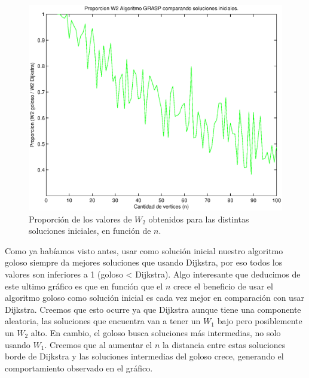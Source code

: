 \begin{figure}[H]
  \begin{center}
    \begin{minipage}{0.7\linewidth}
      \includegraphics[width=\linewidth]{graficos/grasp_comparacion_soluciones_iniciales_tiempo.eps}
      \caption{Proporción de los valores de $W_2$ obtenidos para las distintas soluciones iniciales, en función de $n$.}\label{fig:grasp-soluciones-iniciales-tiempo}
    \end{minipage}
  \end{center}
\end{figure}


Como ya habíamos visto antes, usar como solución inicial nuestro algoritmo goloso siempre da mejores soluciones que usando Dijkstra, por eso todos los valores son inferiores a 1 (goloso < Dijkstra). Algo interesante que deducimos de este ultimo gráfico es que en función que el $n$ crece el beneficio de usar el algoritmo goloso como solución inicial es cada vez mejor en comparación con usar Dijkstra. Creemos que esto ocurre ya que Dijkstra aunque tiene una componente aleatoria, las soluciones que encuentra van a tener un $W_1$ bajo pero posiblemente un $W_2$ alto. En cambio, el goloso busca soluciones más intermedias, no solo usando $W_1$. Creemos que al aumentar el $n$ la distancia entre estas soluciones borde de Dijkstra y las soluciones intermedias del goloso crece, generando el comportamiento observado en el gráfico. 